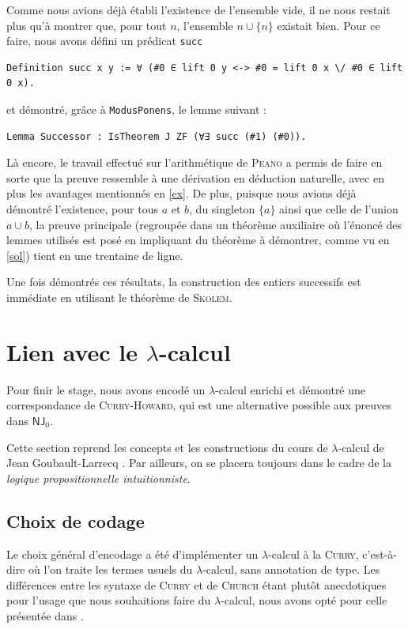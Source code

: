 \documentclass[a4paper]{article}
\newcommand{\NJ}{\mathsf{NJ}}
\begin{document}
Comme nous avions déjà établi l'existence de l'ensemble vide, il ne nous restait plus qu'à montrer que, pour tout $n$, l'ensemble $n \cup \{ n \}$ existait bien. Pour ce faire, nous avons défini un prédicat \verb+succ+
\begin{verbatim}
Definition succ x y := ∀ (#0 ∈ lift 0 y <-> #0 = lift 0 x \/ #0 ∈ lift 0 x).
\end{verbatim}
et démontré, grâce à \verb+ModusPonens+, le lemme suivant :
\begin{verbatim}
Lemma Successor : IsTheorem J ZF (∀∃ succ (#1) (#0)).
\end{verbatim}
Là encore, le travail effectué sur l'arithmétique de \textsc{Peano} a permis de faire en sorte que la preuve ressemble à une dérivation en déduction naturelle, avec en plus les avantages mentionnés en \ref{ex}. De plus, puisque nous avions déjà démontré l'existence, pour tous $a$ et $b$, du singleton $\{ a \}$ ainsi que celle de l'union $a \cup b$, la preuve principale (regroupée dans un théorème auxiliaire où l'énoncé des lemmes utilisés est posé en impliquant du théorème à démontrer, comme vu en \ref{sol}) tient en une trentaine de ligne.

Une fois démontrés ces résultats, la construction des entiers successifs est immédiate en utilisant le théorème de \textsc{Skolem}.

\newpage


\section{Lien avec le $\lambda$-calcul}

Pour finir le stage, nous avons encodé un $\lambda$-calcul enrichi et démontré une correspondance de \textsc{Curry-Howard}, qui est une alternative possible aux preuves dans $\NJ_0$.

Cette section reprend les concepts et les constructions du cours de $\lambda$-calcul de Jean Goubault-Larrecq \cite{polylam}. Par ailleurs, on se placera toujours dans le cadre de la \emph{logique propositionnelle intuitionniste}.

\subsection{Choix de codage}

Le choix général d'encodage a été d'implémenter un $\lambda$-calcul à la \textsc{Curry}, c'est-à-dire où l'on traite les termes usuels du $\lambda$-calcul, sans annotation de type. Les différences entre les syntaxe de \textsc{Curry} et de \textsc{Church} étant plutôt anecdotiques pour l'usage que nous souhaitions faire du $\lambda$-calcul, nous avons opté pour celle présentée dans \cite{polylam}.
\end{document}
